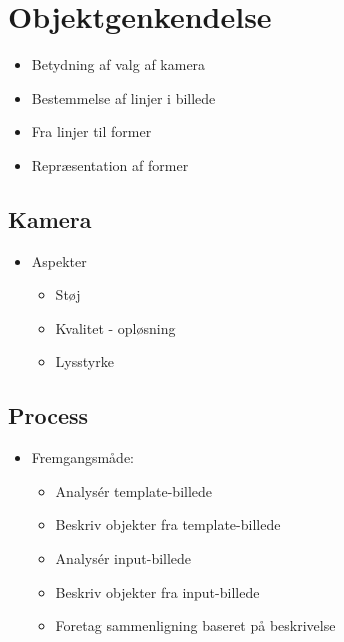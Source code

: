 \section{Objektgenkendelse}
\begin{frame}[fragile]{\insertsection}
    \begin{itemize}
	    \item Betydning af valg af kamera
	    \item Bestemmelse af linjer i billede
	    \item Fra linjer til former
	    \item Repræsentation af former 
    \end{itemize}
\end{frame}

\subsection{Kamera}
\begin{frame}[fragile]{\insertsection}{\insertsubsection}
  \begin{itemize}
    \item Aspekter
        \begin{itemize}
          \item Støj
          \item Kvalitet - opløsning
          \item Lysstyrke
        \end{itemize}
  \end{itemize}
\end{frame}

\subsection{Process}
\begin{frame}[fragile]{\insertsection}{\insertsubsection}
  \begin{itemize}
    \item Fremgangsmåde:
        \begin{itemize}
          \item Analysér template-billede
          \item Beskriv objekter fra template-billede
          \item Analysér input-billede
          \item Beskriv objekter fra input-billede
          \item Foretag sammenligning baseret på beskrivelse
        \end{itemize}
  \end{itemize}
\end{frame}

